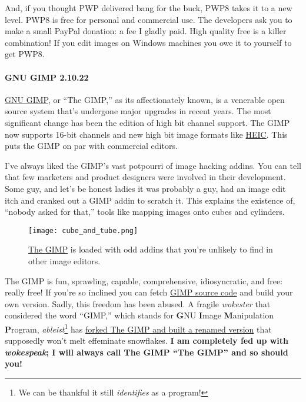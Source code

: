 And, if you thought PWP delivered bang for the buck, PWP8 takes it to a
new level. PWP8 is free for personal and commercial use. The developers
ask you to make a small PayPal donation: a fee I gladly paid. High
quality free is a killer combination! If you edit images on Windows
machines you owe it to yourself to get PWP8.

\paragraph{GNU GIMP 2.10.22}\label{gnu-gimp-2.10.22}

\href{https://www.gimp.org/}{GNU GIMP}, or ``The GIMP,'' as its
affectionately known, is a venerable open source system that's undergone
major upgrades in recent years. The most significant change has been the
edition of high bit channel support. The GIMP now supports 16-bit
channels and new high bit image formats like
\href{https://www.macworld.co.uk/feature/what-is-heic-3660408/}{HEIC}.
This puts the GIMP on par with commercial editors.

I've always liked the GIMP's vast potpourri of image hacking addins. You
can tell that few marketers and product designers were involved in their
development. Some guy, and let's be honest ladies it was probably a guy,
had an image edit itch and cranked out a GIMP addin to scratch it. This
explains the existence of, ``nobody asked for that,'' tools like mapping
images onto cubes and cylinders.



\captionsetup[figure]{labelformat=empty}
\begin{SCfigure}
\centering
\texttt{[image: cube\_and\_tube.png]}
\caption{\href{https://www.gimp.org/}{The GIMP} is loaded with odd addins that
you're unlikely to find in other image editors.}
\label{fig:7048X5}
\end{SCfigure}

The GIMP is fun, sprawling, capable, comprehensive, idiosyncratic, and
free: really free! If you're so inclined you can fetch
\href{https://gitlab.gnome.org/GNOME/gimp}{GIMP source code} and build
your own version. Sadly, this freedom has been abused. A fragile
\emph{wokester} that considered the word ``GIMP,'' which stands for
\textbf{G}NU \textbf{I}mage \textbf{M}anipulation \textbf{P}rogram,
\emph{ableist}\footnote{We can be thankful it still \emph{identifies} as a
  program!} has
\href{https://thenextweb.com/dd/2019/08/28/developer-forks-gimp-image-editor-over-naughty-name/}{forked
The GIMP and built a renamed version} that supposedly won't melt
effeminate snowflakes. \textbf{I am completely fed up with
\emph{wokespeak}; I will always call The GIMP ``The GIMP'' and so should
you!}


